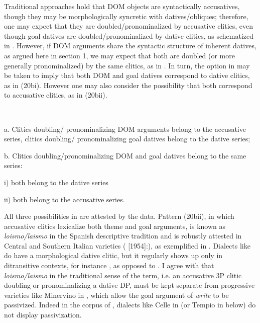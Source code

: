\documentclass[output=paper]{langscibook}
\begin{document}
Traditional approaches hold that DOM objects are syntactically accusatives, though they may be morphologically syncretic with datives/obliques; therefore, one may expect that they are doubled/pronominalized by accusative clitics, even though goal datives are doubled/pronominalized by dative clitics, as schematized in . However, if DOM arguments share the syntactic structure of inherent datives, as argued here in section 1, we may expect that both are doubled (or more generally pronominalized) by the same clitics, as in . In turn, the option in  may be taken to imply that both DOM and goal datives correspond to dative clitics, as in (20bi). However one may also consider the possibility that both correspond to accusative clitics, as in (20bii). 

\ea\label{ex:key:}
{}\\
\z

a.  Clitics doubling/ pronominalizing DOM arguments belong to the accusative series, clitics doubling/ pronominalizing goal datives belong to the dative series;



b.  Clitics doubling/pronominalizing DOM and goal datives belong to the same series:



  i)  both belong to the dative series


  ii)  both belong to the accusative series.

All three possibilities in  are attested by the data. Pattern (20bii), in which accusative clitics lexicalize both theme and goal arguments, is known as \textit{loismo/laismo} in the Spanish descriptive tradition and is robustly attested in Central and Southern Italian varieties (\citealt{Rohlfs1969} [1954]:), as exemplified in . Dialects like  do have a morphological dative clitic, but it regularly shows up only in ditransitive contexts, for instance , as opposed to . I agree with \citet{Pineda2016} that \textit{loismo/laismo} in the traditional sense of the term, i.e. an accusative 3P clitic doubling or pronominalizing a dative DP, must be kept separate from progressive varieties like Minervino in , which allow the goal argument of \textit{write} to be passivized. Indeed in the corpus of \citet{ManziniSavoia2005}, dialects like Celle in  (or Tempio in  below) do not display passivization. 
\end{document}
